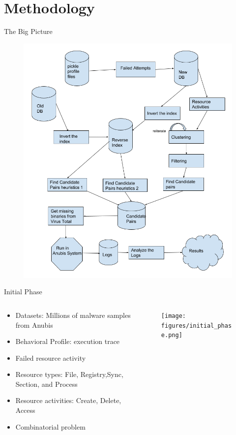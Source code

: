 \documentclass{beamer}
\begin{document}
\section{Methodology}
\label{sec:Methodology}
\begin{frame}[h]{The Big Picture}
  \begin{figure}[h]
    \centering
    \includegraphics[scale=0.25]{figures/bigpicture.png}
  \label{fig:malware_type}
  \end{figure}
\end{frame}
\begin{frame}[h]{Initial Phase}
  \begin{columns}
    \begin{column}{5cm}
      \begin{itemize}
        \item Datasets: Millions of malware samples from Anubis
        \item Behavioral Profile: execution trace
        \item Failed resource activity
        \item Resource types: File, Registry,Sync, Section, and Process
        \item Resource activities: Create, Delete, Access
        \item Combinatorial problem
      \end{itemize}
    \end{column}
    \begin{column}{5cm}
      \begin{figure}[h]
        \centering
        \texttt{[image: figures/initial\_phase.png]}
      \label{fig:malware_type}
      \end{figure}
    \end{column}
  \end{columns}
\end{frame}
\end{document}
